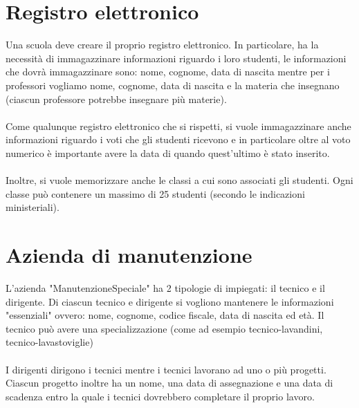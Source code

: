 \documentclass{article}
\begin{document}
\section{Registro elettronico}

Una scuola deve creare il proprio registro elettronico. In particolare, ha la necessità di immagazzinare informazioni
riguardo i loro studenti, le informazioni che dovrà immagazzinare sono: nome, cognome, data di nascita mentre per i professori
vogliamo nome, cognome, data di nascita e la materia che insegnano (ciascun professore potrebbe insegnare più materie). \\ \\

Come qualunque registro elettronico che si rispetti, si vuole immagazzinare anche informazioni riguardo i voti
che gli studenti ricevono e in particolare oltre al voto numerico è importante avere la data di quando quest'ultimo 
è stato inserito. \\ \\

Inoltre, si vuole memorizzare anche le classi a cui sono associati gli studenti. Ogni classe può contenere un massimo
di 25 studenti (secondo le indicazioni ministeriali).

\section{Azienda di manutenzione}

L'azienda "ManutenzioneSpeciale" ha 2 tipologie di impiegati: il tecnico e il dirigente. Di ciascun tecnico e dirigente si vogliono mantenere
le informazioni "essenziali" ovvero: nome, cognome, codice fiscale, data di nascita ed età. Il tecnico può avere una specializzazione 
(come ad esempio tecnico-lavandini, tecnico-lavastoviglie) \\ \\

I dirigenti dirigono i tecnici mentre i tecnici lavorano ad uno o più progetti. Ciascun progetto inoltre ha un nome, una data di assegnazione e 
una data di scadenza entro la quale i tecnici dovrebbero completare il proprio lavoro.
\end{document}
